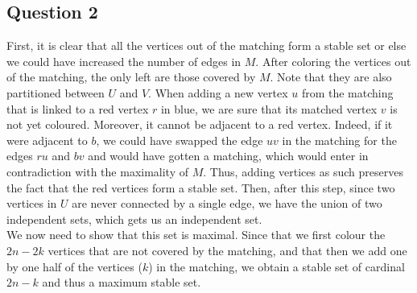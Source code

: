 \documentclass{cours}
\begin{document}
\subsection{Question 2}
First, it is clear that all the vertices out of the matching form a stable set or else we could have increased the number of edges in $M$. After coloring the vertices out of the matching, the only left are those covered by $M$. Note that they are also partitioned between $U$ and $V$. When adding a new vertex $u$ from the matching that is linked to a red vertex $r$ in blue, we are sure that its matched vertex $v$ is not yet coloured. Moreover, it cannot be adjacent to a red vertex. Indeed, if it were adjacent to $b$, we could have swapped the edge $uv$ in the matching for the edges $ru$ and $bv$ and would have gotten a matching, which would enter in contradiction with the maximality of $M$. Thus, adding vertices as such preserves the fact that the red vertices form a stable set. Then, after this step, since two vertices in $U$ are never connected by a single edge, we have the union of two independent sets, which gets us an independent set.\\
We now need to show that this set is maximal. Since that we first colour the $2n - 2k$ vertices that are not covered by the matching, and that then we add one by one half of the vertices ($k$) in the matching, we obtain a stable set of cardinal $2n - k$ and thus a maximum stable set. 
\end{document}

